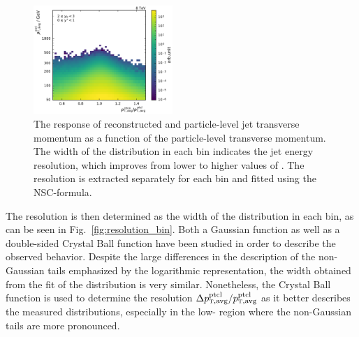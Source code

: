 \begin{figure}[htbp]
    \includegraphics[width=0.47\textwidth]{figures/measurement/gen_vs_reco_vs_gen_ptavg_yb2ys0.pdf}
    \caption[Comparison of particle-level and reconstructed dijet transverse momentum]
            {The response of reconstructed and particle-level jet transverse
                momentum as a function of the particle-level transverse momentum.
                The width of the distribution in each \ptavg bin indicates the
                jet energy resolution, which improves from lower to higher values of \ptavg. The
                resolution is extracted separately for each bin and
                fitted using the NSC-formula.}
    \label{fig:gen_vs_reco_over_gen}
\end{figure}

The resolution is then determined as the width of the distribution in each
\ptavggen
bin, as can be seen in Fig.~\ref{fig:resolution_bin}. Both a Gaussian function
as well as a double-sided Crystal Ball function have been studied in order to
describe the observed behavior. Despite the large differences in the
description of the non-Gaussian tails emphasized by the logarithmic
representation, the width obtained from the fit of the distribution is very similar.
Nonetheless, the Crystal Ball function is used to determine the resolution
$\Delta \ptavggen / \ptavggen$ as
it better describes the measured distributions, especially in the low-\pt
region where the non-Gaussian tails are more pronounced.

